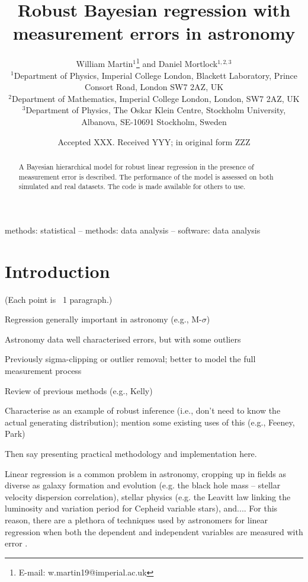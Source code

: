\documentclass[fleqn,usenatbib]{mnras}
\title[Robust regression in astronomy]{Robust Bayesian regression with measurement errors in astronomy}
\author[W. Martin et al.]{
William Martin$^{1}$\thanks{E-mail: w.martin19@imperial.ac.uk}
and Daniel Mortlock$^{1,2,3}$
\\
$^{1}$Department of Physics, Imperial College London, Blackett Laboratory, Prince Consort Road, London SW7 2AZ, UK\\
$^{2}$Department of Mathematics, Imperial College London, London, SW7 2AZ, UK\\
$^{3}$Department of Physics, The Oskar Klein Centre, Stockholm University, Albanova, SE-10691 Stockholm, Sweden
}
\date{Accepted XXX. Received YYY; in original form ZZZ}
\begin{document}
\label{firstpage}
\pagerange{\pageref{firstpage}--\pageref{lastpage}}
\maketitle

\begin{abstract}
A Bayesian hierarchical model for robust linear regression in the presence of measurement error is described.
The performance of the model is assessed on both simulated and real datasets.
The code is made available for others to use.
\end{abstract}

\begin{keywords}
methods: statistical -- methods: data analysis -- software: data analysis
\end{keywords}



\section{Introduction}
\label{sec:intro}

{\color{red}

(Each point is ~1 paragraph.)

Regression generally important in astronomy (e.g., M-$\sigma$)

Astronomy data well characterised errors, but with some outliers

Previously sigma-clipping or outlier removal; better to model the full measurement process

Review of previous methods (e.g., Kelly)

Characterise as an example of robust inference (i.e., don't need to know the actual generating distribution); mention some existing uses of this (e.g., Feeney, Park)

Then say presenting practical methodology and implementation here.
}

Linear regression is a common problem in astronomy, cropping up in fields as
diverse as {\color{red} galaxy formation and evolution (e.g. the black hole
mass -- stellar velocity dispersion correlation), stellar physics (e.g. the
Leavitt law linking the luminosity and variation period for Cepheid variable
stars), and...}. For this reason, there are a plethora of techniques used by
astronomers for linear regression when both the dependent and independent
variables are measured with error \citep[e.g.][]{Press:1992, Akritas:1996,
Tremaine:2002, Kelly:2007}.
\end{document}

